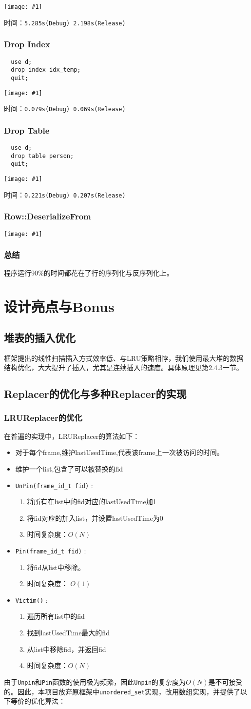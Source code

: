 \documentclass[12pt, a4paper]{article}
\def\c#1{\texttt{#1}}
\def\s#1{\section{#1}}
\def\ss#1{\subsection{#1}}
\def\sss#1{\subsubsection{#1}}
\def\fid{frame\_id\_t\ }
\def\p{\par}
\def\g#1{\begin{center}\texttt{[image: \#1]}\end{center}}
\begin{document}
\g{perf/create-index.png}
时间：\c{5.285s(Debug) 2.198s(Release)}
\sss{Drop Index}
\begin{lstlisting}
  use d;
  drop index idx_temp;
  quit;  
\end{lstlisting}
\g{perf/drop-index.png}
时间：\c{0.079s(Debug) 0.069s(Release)}
\sss{Drop Table}
\begin{lstlisting}
  use d;
  drop table person;
  quit;
\end{lstlisting}
\g{perf/drop-table.png}
时间：\c{0.221s(Debug) 0.207s(Release)}
\sss{Row::DeserializeFrom}
\g{perf/deserialize.png}
\sss{总结}
程序运行90\%的时间都花在了行的序列化与反序列化上。
\s{设计亮点与Bonus}
\ss{堆表的插入优化}
\p 框架提出的线性扫描插入方式效率低、与LRU策略相悖，我们使用最大堆的数据结构优化，大大提升了插入，尤其是连续插入的速度。具体原理见第2.4.3一节。
\ss{Replacer的优化与多种Replacer的实现}
\sss{LRUReplacer的优化}
在普遍的实现中，LRUReplacer的算法如下：
\begin{itemize}
  \item 对于每个frame,维护lastUsedTime,代表该frame上一次被访问的时间。
  \item 维护一个list,包含了可以被替换的fid
  \item \c{UnPin(\fid fid)} :\begin{enumerate}
    \item 将所有在list中的fid对应的lastUsedTime加1
    \item 将fid对应的加入list，并设置lastUsedTime为0
    \item 时间复杂度：$O(N)$
  \end{enumerate} 
  \item \c{Pin(\fid fid)} : \begin{enumerate}
    \item 将fid从list中移除。
    \item 时间复杂度： $O(1)$
  \end{enumerate}
  \item \c{Victim()} : \begin{enumerate}
    \item 遍历所有list中的fid
    \item 找到lastUsedTime最大的fid
    \item 从list中移除fid，并返回fid
    \item 时间复杂度：$O(N)$
  \end{enumerate}
\end{itemize}
\p 由于\c{Unpin}和\c{Pin}函数的使用极为频繁，因此\c{Unpin}的复杂度为$O(N)$是不可接受的。因此，本项目放弃原框架中\c{unordered\_set}实现，改用数组实现，并提供了以下等价的优化算法：
\end{document}
